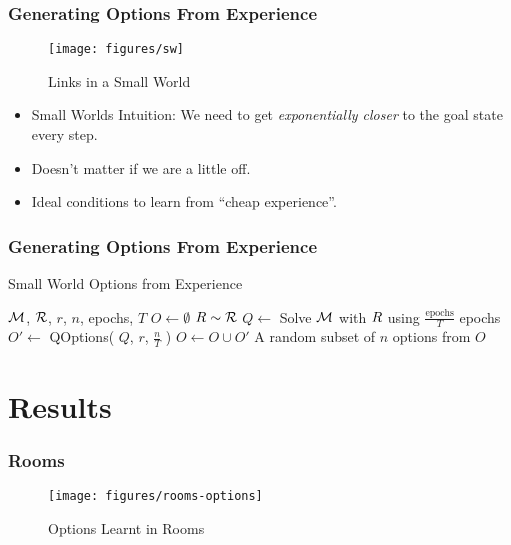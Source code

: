 \documentclass{beamer}
\begin{document}
\begin{frame}
    \frametitle{Generating Options From Experience}
    \label{frame:swoptions-options-from-experience}

    \begin{figure}[h]
        \centering
        \texttt{[image: figures/sw]}
        \label{fig:small-world}
        \caption{Links in a Small World}
    \end{figure}

    \begin{itemize}
      \item Small Worlds Intuition: We need to get {\em exponentially closer} to the goal state every step.
      \item Doesn't matter if we are a little off.
      \item Ideal conditions to learn from ``cheap experience''.
    \end{itemize}

\end{frame}

\begin{frame}
    \frametitle{Generating Options From Experience}
    \label{frame:swoptions-options-from-experience-algo}

\begin{algorithm}[H]
  \caption{Small World Options from Experience}
  \label{algo:small-world-experience}
  \begin{algorithmic}[1]
      \REQUIRE $\mathcal{M}$, $\mathcal{R}$, $r$, $n$, epochs, $T$
      \STATE $O \gets \emptyset$
        \STATE $R \sim \mathcal{R}$
        \STATE $Q \gets $ Solve $\mathcal{M}$ with $R$ using
            $\frac{\textrm{epochs}}{T}$ epochs
        \STATE $O' \gets $ QOptions( $Q$, $r$,
            $\frac{n}{T}$ )
        \STATE $O \gets O \cup O'$
      \ENDFOR
      \RETURN A random subset of $n$ options from $O$
  \end{algorithmic}
\end{algorithm}

\end{frame}

\section{Results}

\begin{frame}
    \frametitle{Rooms}
    \label{frame:results-rooms-domain}
    \begin{figure}[h]
        \centering
        \texttt{[image: figures/rooms-options]}
        \label{fig:rooms-domain}
        \caption{Options Learnt in Rooms}
    \end{figure}
\end{frame}
\end{document}
